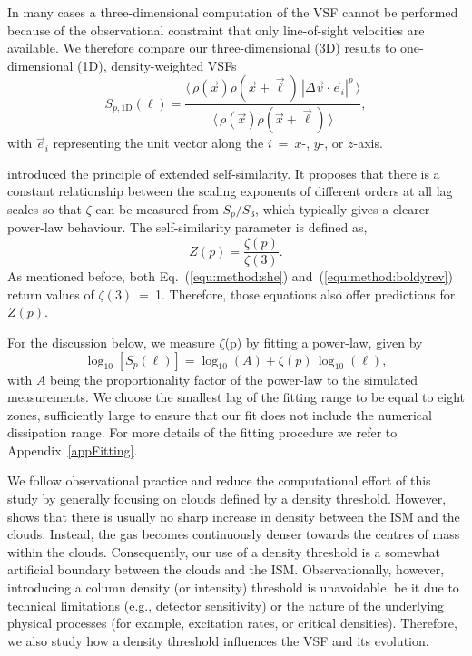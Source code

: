 In many cases a three-dimensional computation of the VSF cannot be performed because of the observational constraint that only line-of-sight velocities are available.
We therefore compare our three-dimensional (3D) results to one-dimensional (1D), density-weighted VSFs
\begin{equation}
	\mathit{S}_{p,\mathrm{1D}} (\ell) = \frac{\langle \, \rho(\vec{x}) \rho(\vec{x}+\vec{\ell}) \, |\Delta 
        \vec{v} \cdot \vec{e}_i|^p  \, \rangle}{\langle  \, \rho(\vec{x}) \rho(\vec{x}+\vec{\ell}) \, \rangle} ,
	\label{equ:method:def_vsf_1d}
\end{equation}
with $\vec{e}_i$ representing the unit vector along the $i$~=~$x$-, $y$-, or $z$-axis.

\citet{Benzi1993} introduced the principle of extended self-similarity.
It proposes that there is a constant relationship between the scaling
exponents of different orders at all lag scales so that $\zeta$ can be measured from $S_p/S_3$, which typically gives a clearer power-law behaviour.
The self-similarity parameter is defined as,
\begin{equation}
	Z(p) = \frac{\zeta(p)}{\zeta(3)}.
	\label{equ:method:z_def}
\end{equation} 
\noindent
As mentioned before, both Eq.~(\ref{equ:method:she}) and~(\ref{equ:method:boldyrev}) return values of $\zeta(3)$~=~1.
Therefore, those equations also offer predictions for $Z(p)$.

For the discussion below, we measure $\zeta$(p) by fitting a power-law, given by
\begin{equation}
	\log_{10}\left[ S_p(\ell) \right] = \log_{10}\left(A\right) + \zeta(p) \, \log_{10}(\ell) ,
	\label{equ:method:fitting}
\end{equation}
with $A$ being the proportionality factor of the power-law to the simulated measurements.
We choose the smallest lag of the fitting range to be equal to eight zones, sufficiently large to ensure that our fit does not include the numerical dissipation range.
For more details of the fitting procedure we refer to Appendix~\ref{appFitting}.

We follow observational practice and reduce the computational effort of this study by generally focusing on clouds defined by a density threshold.
However,  shows that there is usually no sharp increase in density between the ISM and the clouds. 
Instead, the gas becomes continuously denser towards the centres of mass within the clouds. 
Consequently, our use of a density threshold is a somewhat artificial boundary between the clouds and the ISM. Observationally, however, introducing a column density (or intensity) threshold is unavoidable, be it due to technical limitations (e.g., detector sensitivity) or the nature of the underlying physical processes (for example, excitation rates, or critical densities).
Therefore, we also study how a density threshold influences the VSF and its evolution.

